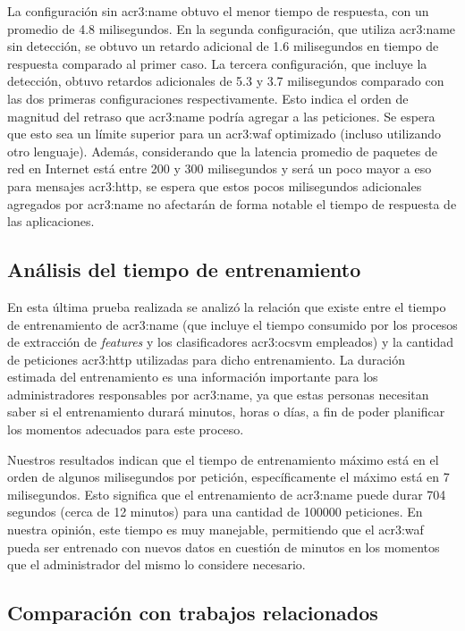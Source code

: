 La configuración sin \gls{acr3:name} obtuvo el menor tiempo de respuesta,
con un promedio de \num{4.8} milisegundos.
En la segunda configuración, que utiliza \gls{acr3:name} sin detección,
se obtuvo un retardo adicional de \num{1.6} milisegundos en tiempo de
respuesta comparado al primer caso. La tercera configuración, que incluye
la detección, obtuvo retardos adicionales de \num{5.3} y \num{3.7}
milisegundos comparado con las dos primeras configuraciones respectivamente.
Esto indica el orden de magnitud del retraso que \gls{acr3:name} podría
agregar a las peticiones. Se espera que esto sea un límite superior
para un \gls{acr3:waf} optimizado (incluso utilizando otro lenguaje).
Además, considerando que la latencia promedio de paquetes de red en
Internet está entre 200 y 300 milisegundos \cite{internetWeatherMap}
y será un poco mayor a eso para mensajes \gls{acr3:http}, se espera que
estos pocos milisegundos adicionales agregados por \gls{acr3:name} no
afectarán de forma notable el tiempo de respuesta de las aplicaciones.


\subsection{Análisis del tiempo de entrenamiento}

En esta última prueba realizada se analizó la relación que existe entre
el tiempo de entrenamiento de \gls{acr3:name} (que incluye el tiempo
consumido por los procesos de extracción de \textit{features} y los
clasificadores \gls{acr3:ocsvm} empleados) y la cantidad de peticiones
\gls{acr3:http} utilizadas para dicho entrenamiento.
La duración estimada del entrenamiento es una información importante
para los administradores responsables por \gls{acr3:name}, ya que estas
personas necesitan saber si el entrenamiento durará minutos, horas o días,
a fin de poder planificar los momentos adecuados para este proceso.

Nuestros resultados indican que el tiempo de entrenamiento
máximo está en el orden de algunos milisegundos por petición, específicamente
el máximo está en 7 milisegundos. Esto significa que el entrenamiento
de \gls{acr3:name} puede durar 704 segundos (cerca de 12 minutos)
para una cantidad de \num{100000} peticiones.
En nuestra opinión, este tiempo es muy manejable, permitiendo que el
\gls{acr3:waf} pueda ser entrenado con nuevos datos en cuestión de
minutos en los momentos que el administrador del mismo lo considere
necesario.


\subsection{Comparación con trabajos relacionados}

